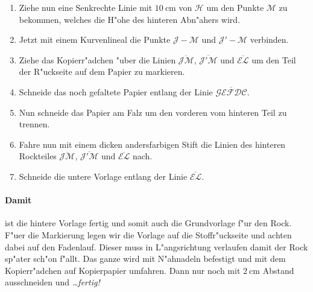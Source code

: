 \documentclass{scrartcl}
\begin{document}
\begin{enumerate}
  \item Ziehe nun eine Senkrechte Linie mit $\SI{10}{\centi\meter}$ von
    $\mathcal{H}$ um den Punkte $\mathcal{M}$ zu bekommen, welches die H"ohe des 
    hinteren Abn"ahers wird.

  \item Jetzt mit einem Kurvenlineal die Punkte $\mathcal{J-M}$ und
    $\mathcal{J'-M}$ verbinden.

  \item Ziehe das Kopierr"adchen "uber die Linien $\overline{\mathcal{JM}}$,
    $\overline{\mathcal{J'M}}$ und $\overline{\mathcal{EL}}$ um den Teil der
    R"uckseite auf dem Papier zu markieren.

  \item Schneide das noch gefaltete Papier entlang der Linie
    $\overline{\mathcal{GEFDC}}$. 

  \item Nun schneide das Papier am Falz um den vorderen vom hinteren Teil zu
    trennen. 

  \item Fahre nun mit einem dicken andersfarbigen Stift die Linien des hinteren
    Rockteiles $\overline{\mathcal{JM}}$, $\overline{\mathcal{J'M}}$ und
    $\overline{\mathcal{EL}}$ nach.

  \item Schneide die untere Vorlage entlang der Linie $\overline{\mathcal{EL}}$.

\end{enumerate}

\paragraph{Damit} ist die hintere Vorlage fertig und somit auch die Grundvorlage
f"ur den Rock. F"uer die Markierung legen wir die Vorlage auf die 
Stoffr"uckseite und achten dabei auf den Fadenlauf. Dieser muss in 
L"angsrichtung verlaufen damit der Rock sp"ater sch"on f"allt.
Das ganze wird mit N"ahnadeln befestigt und mit dem Kopierr"adchen auf
Kopierpapier umfahren. Dann nur noch mit $\SI{2}{\centi\meter}$ Abstand
ausschneiden und \emph{\dots fertig!}
\end{document}

